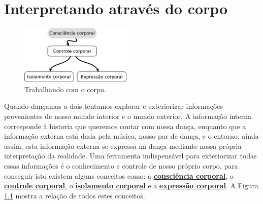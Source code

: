 

\chapter{Interpretando através do corpo}
\label{fig:bodyrelations}



\begin{figure}
\vspace{-10pt}
  \centering
    \includegraphics[width=0.475\textwidth]{chapters/cap-body/total.eps}
\caption{Trabalhando com o corpo.}
\vspace{-10pt}
\label{fig:bodycontroltotal}
\end{figure}
Quando dançamos a dois tentamos explorar e exteriorizar informações
provenientes de nosso mundo interior e o mundo exterior.
A informação interna corresponde à historia que queremos contar com nossa dança,
enquanto que a informação externa está dada pela música, nosso par de dança, e o entorno;
ainda assim, esta informação externa se expressa na dança 
mediante nossa própria interpretação da realidade.
Uma ferramenta indispensável para exteriorizar todas essas informações é o conhecimento e controle de
nosso próprio corpo, para conseguir isto existem alguns conceitos
como: 
a \hyperref[sec:BodyAwareness]{\textbf{consciência corporal}}, 
o \hyperref[sec:BodyControl]{\textbf{controle corporal}}, 
o \hyperref[sec:BodyIsolation]{\textbf{isolamento corporal}} e  
a \hyperref[sec:BodyExpression]{\textbf{expressão corporal}}.
A Figura \ref{fig:bodycontroltotal} mostra a relação de todos estes conceitos.


